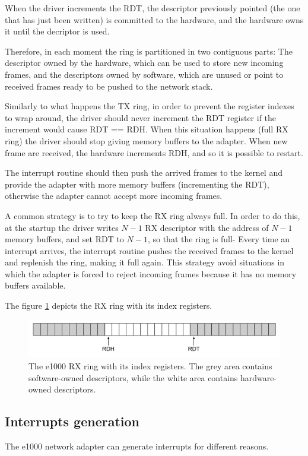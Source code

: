When the driver increments the RDT, the descriptor previously pointed (the one that has just been written) is committed to the hardware,
and the hardware owns it until the decriptor is used.

Therefore, in each moment the ring is partitioned in two contiguous parts: The descriptor owned by the hardware, which can be
used to store new incoming frames, and the descriptors owned by software, which are unused or point to received frames ready to
be pushed to the network stack.

Similarly to what happens the TX ring, in order to prevent the register indexes to wrap around, the driver should never increment the RDT
register if the increment would cause RDT == RDH. When this situation happens (full RX ring) the driver should stop giving memory buffers to
the adapter. When new frame are received, the hardware increments RDH, and so it is possible to restart.

The interrupt routine should then push the arrived frames to the kernel and provide the adapter with more memory buffers (incrementing
the RDT), otherwise the adapter cannot accept more incoming frames.

A common strategy is to try to keep the RX ring always full. In order to do this, at the startup
the driver writes $N-1$ RX descriptor with the address of $N-1$ memory buffers, and set RDT to $N-1$, so that the ring is full-
Every time an interrupt arrives, the interrupt routine pushes the received frames to the kernel and replenish the ring, making it full again.
This strategy avoid situations in which the adapter is forced to reject incoming frames because it has no memory buffers available.

The figure \ref{fig:rxring} depicts the RX ring with its index registers.

\begin{figure}[bt]
\centering
\includegraphics[scale = 0.35]{rx-ring.pdf}
\caption{The e1000 RX ring with its index registers. The grey area contains software-owned descriptors, while the white area
	contains hardware-owned descriptors.}
\label{fig:rxring}
\end{figure}


\subsection{Interrupts generation}
\label{sec:e1000int}
The e1000 network adapter can generate interrupts for different reasons.

